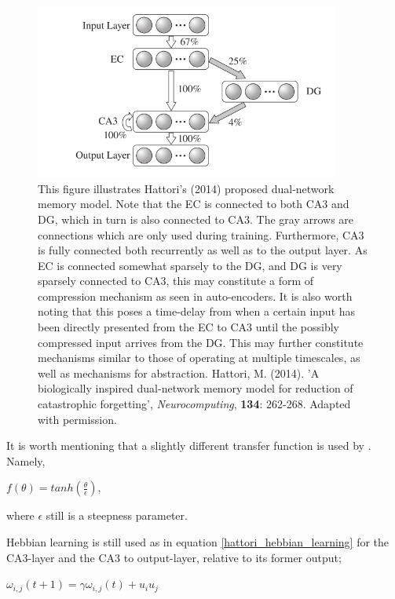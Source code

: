 \begin{figure}
\centering
\includegraphics[width=10cm]{fig/hattori2014_hpc_module}
\caption{This figure illustrates Hattori's (2014) proposed dual-network memory model. Note that the EC is connected to both CA3 and DG, which in turn is also connected to CA3. The gray arrows are connections which are only used during training. Furthermore, CA3 is fully connected both recurrently as well as to the output layer. As EC is connected somewhat sparsely to the DG, and DG is very sparsely connected to CA3, this may constitute a form of compression mechanism as seen in auto-encoders. It is also worth noting that this poses a time-delay from when a certain input has been directly presented from the EC to CA3 until the possibly compressed input arrives from the DG. This may further constitute mechanisms similar to those of operating at multiple timescales, as well as mechanisms for abstraction.
Hattori, M. (2014). 'A biologically inspired dual-network memory model for reduction of catastrophic forgetting', \textit{Neurocomputing}, \textbf{134}: 262-268. Adapted with permission.}
\label{fig:hattori_2014_model}
\end{figure}

It is worth mentioning that a slightly different transfer function is used by \cite{Hattori2014}. Namely,

\begin{center}
    $f(\theta) = tanh(\frac{\theta}{\epsilon})$,
\end{center}
where $\epsilon$ still is a steepness parameter.

Hebbian learning is still used as in equation \ref{hattori_hebbian_learning} for the CA3-layer and the CA3 to output-layer, relative to its former output;

\begin{center}
\begin{math}
    \omega_{i,j}(t+1) = \gamma \omega_{i,j}(t) + u_i u_j
\end{math}
\end{center}

